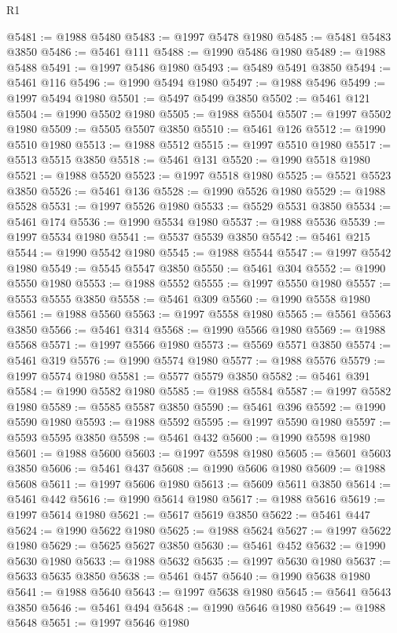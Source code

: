 \begin{lexlean}{R1}
\begin{coremodule}
@5481 := @1988 @5480
@5483 := @1997 @5478 @1980
@5485 := @5481 @5483 @3850
@5486 := @5461 @111
@5488 := @1990 @5486 @1980
@5489 := @1988 @5488
@5491 := @1997 @5486 @1980
@5493 := @5489 @5491 @3850
@5494 := @5461 @116
@5496 := @1990 @5494 @1980
@5497 := @1988 @5496
@5499 := @1997 @5494 @1980
@5501 := @5497 @5499 @3850
@5502 := @5461 @121
@5504 := @1990 @5502 @1980
@5505 := @1988 @5504
@5507 := @1997 @5502 @1980
@5509 := @5505 @5507 @3850
@5510 := @5461 @126
@5512 := @1990 @5510 @1980
@5513 := @1988 @5512
@5515 := @1997 @5510 @1980
@5517 := @5513 @5515 @3850
@5518 := @5461 @131
@5520 := @1990 @5518 @1980
@5521 := @1988 @5520
@5523 := @1997 @5518 @1980
@5525 := @5521 @5523 @3850
@5526 := @5461 @136
@5528 := @1990 @5526 @1980
@5529 := @1988 @5528
@5531 := @1997 @5526 @1980
@5533 := @5529 @5531 @3850
@5534 := @5461 @174
@5536 := @1990 @5534 @1980
@5537 := @1988 @5536
@5539 := @1997 @5534 @1980
@5541 := @5537 @5539 @3850
@5542 := @5461 @215
@5544 := @1990 @5542 @1980
@5545 := @1988 @5544
@5547 := @1997 @5542 @1980
@5549 := @5545 @5547 @3850
@5550 := @5461 @304
@5552 := @1990 @5550 @1980
@5553 := @1988 @5552
@5555 := @1997 @5550 @1980
@5557 := @5553 @5555 @3850
@5558 := @5461 @309
@5560 := @1990 @5558 @1980
@5561 := @1988 @5560
@5563 := @1997 @5558 @1980
@5565 := @5561 @5563 @3850
@5566 := @5461 @314
@5568 := @1990 @5566 @1980
@5569 := @1988 @5568
@5571 := @1997 @5566 @1980
@5573 := @5569 @5571 @3850
@5574 := @5461 @319
@5576 := @1990 @5574 @1980
@5577 := @1988 @5576
@5579 := @1997 @5574 @1980
@5581 := @5577 @5579 @3850
@5582 := @5461 @391
@5584 := @1990 @5582 @1980
@5585 := @1988 @5584
@5587 := @1997 @5582 @1980
@5589 := @5585 @5587 @3850
@5590 := @5461 @396
@5592 := @1990 @5590 @1980
@5593 := @1988 @5592
@5595 := @1997 @5590 @1980
@5597 := @5593 @5595 @3850
@5598 := @5461 @432
@5600 := @1990 @5598 @1980
@5601 := @1988 @5600
@5603 := @1997 @5598 @1980
@5605 := @5601 @5603 @3850
@5606 := @5461 @437
@5608 := @1990 @5606 @1980
@5609 := @1988 @5608
@5611 := @1997 @5606 @1980
@5613 := @5609 @5611 @3850
@5614 := @5461 @442
@5616 := @1990 @5614 @1980
@5617 := @1988 @5616
@5619 := @1997 @5614 @1980
@5621 := @5617 @5619 @3850
@5622 := @5461 @447
@5624 := @1990 @5622 @1980
@5625 := @1988 @5624
@5627 := @1997 @5622 @1980
@5629 := @5625 @5627 @3850
@5630 := @5461 @452
@5632 := @1990 @5630 @1980
@5633 := @1988 @5632
@5635 := @1997 @5630 @1980
@5637 := @5633 @5635 @3850
@5638 := @5461 @457
@5640 := @1990 @5638 @1980
@5641 := @1988 @5640
@5643 := @1997 @5638 @1980
@5645 := @5641 @5643 @3850
@5646 := @5461 @494
@5648 := @1990 @5646 @1980
@5649 := @1988 @5648
@5651 := @1997 @5646 @1980

\end{coremodule}
\end{lexlean}
